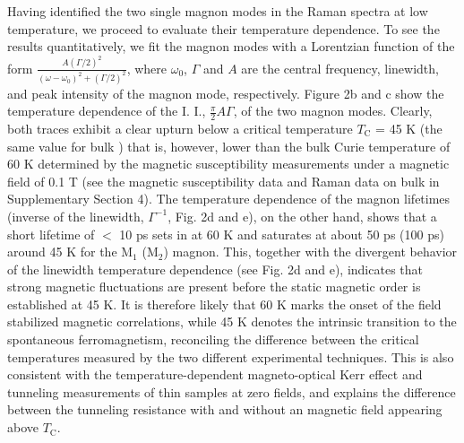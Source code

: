 \documentclass[prl, preprint, superscriptaddress]{revtex4-1}
\begin{document}
Having identified the two single magnon modes in the Raman spectra at low temperature, we proceed to evaluate their temperature dependence. To see the results quantitatively, we fit the magnon modes with a Lorentzian function of the form $\frac{A(\varGamma/2)^2}{(\omega-{\omega}_\mathrm{0})^2+(\varGamma/2)^2}$, where $\omega_\mathrm{0}$, $\varGamma$ and $A$ are the central frequency, linewidth, and peak intensity of the magnon mode, respectively. Figure 2b and c show the temperature dependence of the I. I., $\frac{\pi}{2}A\varGamma$, of the two magnon modes. Clearly, both traces exhibit a clear upturn below a critical temperature $T_\mathrm{C}$ = 45 K (the same value for bulk ) that is, however, lower than the bulk Curie temperature of 60 K determined by the magnetic susceptibility measurements under a magnetic field of 0.1 T (see the magnetic susceptibility data and Raman data on bulk  in Supplementary Section 4). The temperature dependence of the magnon lifetimes (inverse of the linewidth, $\varGamma^{-1}$, Fig. 2d and e), on the other hand, shows that a short lifetime of $<$ 10 ps sets in at 60 K and saturates at about 50 ps (100 ps) around 45 K for the $\mathrm{M_1}$ ($\mathrm{M_2}$) magnon. This, together with the divergent behavior of the linewidth temperature dependence (see Fig. 2d and e), indicates that strong magnetic fluctuations are present before the static magnetic order is established at 45 K. It is therefore likely that 60 K marks the onset of the field stabilized magnetic correlations, while 45 K denotes the intrinsic transition to the spontaneous ferromagnetism, reconciling the difference between the critical temperatures measured by the two different experimental techniques. This is also consistent with the temperature-dependent magneto-optical Kerr effect \cite{Huang2017} and tunneling \cite{Wang2018Very, Kim2018} measurements of thin samples at zero fields, and explains the difference between the tunneling resistance with \cite{Klein2018} and without \cite{Wang2018Very, Kim2018} an magnetic field appearing above $T_\mathrm{C}$. 
\end{document}
